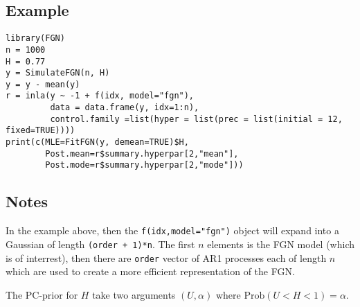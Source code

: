 \documentclass[a4paper,11pt]{article}
\begin{document}
\subsection*{Example}

\begin{verbatim}
library(FGN)
n = 1000
H = 0.77
y = SimulateFGN(n, H)
y = y - mean(y)
r = inla(y ~ -1 + f(idx, model="fgn"), 
         data = data.frame(y, idx=1:n),
         control.family =list(hyper = list(prec = list(initial = 12, fixed=TRUE))))
print(c(MLE=FitFGN(y, demean=TRUE)$H,
        Post.mean=r$summary.hyperpar[2,"mean"],
        Post.mode=r$summary.hyperpar[2,"mode"]))
\end{verbatim}


\subsection*{Notes}

In the example above, then the \texttt{f(idx,model="fgn")} object will
expand into a Gaussian of length \texttt{(order + 1)*n}. The first $n$
elements is the FGN model (which is of interrest), then there are
\texttt{order} vector of AR1 processes each of length $n$ which are
used to create a more efficient representation of the FGN.

The PC-prior for $H$ take two arguments $(U, \alpha)$ where
$\text{Prob}(U < H < 1) = \alpha$.
\end{document}
